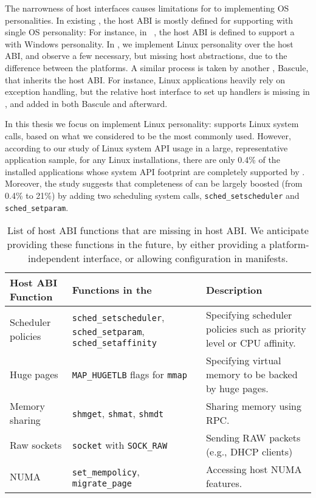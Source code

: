 The narrowness of host interfaces causes limitations for \liboses{} to implementing OS personalities.
In existing \liboses{},
the host ABI is mostly defined for supporting \liboses{} with single OS personality:
For instance, in \drawbridge{}~\citep{porter11drawbridge}, the host ABI
is defined to support a \libos{} with Windows personality.
In \graphene{}, we implement Linux personality over the \drawbridge{} host ABI,
and observe a few necessary, but missing host abstractions,
due to the difference between the platforms.
A similar process is taken by another \libos{}, Bascule, that inherits the \drawbridge{} host ABI.
For instance, Linux applications heavily rely on exception handling,
but the relative host interface to set up handlers
is missing in \drawbridge{}, and added in both Bascule and \graphene{} afterward.

In this thesis we focus on implement Linux personality:
\graphene{} supports \syscalls{} Linux system calls,
based on what we considered to be the most commonly used.
However, according to our study of Linux system API usage in a large, representative application sample,
for any Linux installations,
there are only 0.4\% of the installed applications whose system API footprint
are completely supported by \graphene{}.
Moreover, the study suggests that completeness of \graphene{} can be largely boosted (from 0.4\% to 21\%)
by adding two scheduling system calls,
{\tt sched\_setscheduler} and {\tt sched\_setparam}.


\begin{table}[t]
\footnotesize
\centering
\begin{tabular}{|p{1.2in}|p{2.4in}|p{2.4in}|}
\hline
{\bf Host ABI Function} & {\bf Functions in the \libos{}} & {\bf Description} \\
\hline
Scheduler policies & {\tt sched\_setscheduler}, {\tt sched\_setparam}, {\tt sched\_setaffinity} & Specifying scheduler policies such as priority level or CPU affinity.\\
\hline
Huge pages & {\tt MAP\_HUGETLB} flags for {\tt mmap} & Specifying virtual memory to be backed by huge pages. \\
\hline
Memory sharing & {\tt shmget}, {\tt shmat}, {\tt shmdt} & Sharing memory using RPC. \\
\hline
Raw sockets & {\tt socket} with {\tt SOCK\_RAW}  & Sending RAW packets (e.g., DHCP clients) \\
\hline
NUMA & {\tt set\_mempolicy}, {\tt migrate\_page} & Accessing host NUMA features. \\
\hline
\end{tabular}
\caption[List of host ABI functions to be added in \graphene{} as future works]
{List of host ABI functions that are missing in \graphene{} host ABI.
We anticipate providing these functions in the future,
by either providing a platform-independent interface,
or allowing configuration in manifests.}
\label{tab:future:abi}
\end{table}


